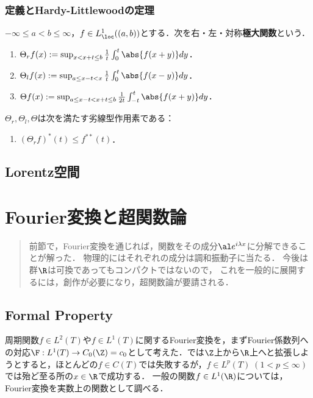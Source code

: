 \documentclass[uplatex,dvipdfmx]{jsreport}
\begin{document}
\subsection{定義とHardy-Littlewoodの定理}

\begin{definition}
    $-\infty\le a<b\le\infty$，$f\in L^1_\loc((a,b))$とする．次を右・左・対称\textbf{極大関数}という．
    \begin{enumerate}
        \item $\Theta_rf(x):=\sup_{x<x+t\le b}\frac{1}{t}\int^t_0\abs{f(x+y)}dy$．
        \item $\Theta_lf(x):=\sup_{a\le x-t<x}\frac{1}{t}\int^t_0\abs{f(x-y)}dy$．
        \item $\Theta f(x):=\sup_{a\le x-t<x+t\le b}\frac{1}{2t}\int^t_{-t}\abs{f(x+y)}dy$．
    \end{enumerate}
\end{definition}

\begin{theorem}
    $\Theta_r,\Theta_l,\Theta$は次を満たす劣線型作用素である：
    \begin{enumerate}
        \item $(\Theta_rf)^*(t)\le f^{**}(t)$．
    \end{enumerate}
\end{theorem}

\section{Lorentz空間}

\chapter{Fourier変換と超関数論}

\begin{quotation}
    前節で，Fourier変換を通じれば，関数をその成分$\al e^{i\lambda x}$に分解できることが解った．
    物理的にはそれぞれの成分は調和振動子に当たる．
    今後は群$\R$は可換であってもコンパクトではないので，
    これを一般的に展開するには，創作が必要になり，超関数論が要請される．
\end{quotation}

\section{Formal Property}

\begin{tcolorbox}[colframe=ForestGreen, colback=ForestGreen!10!white,breakable,colbacktitle=ForestGreen!40!white,coltitle=black,fonttitle=\bfseries\sffamily,
title=]
    周期関数$f\in L^2(T)$や$f\in L^1(T)$に関するFourier変換を，まずFourier係数列への対応$\F:L^1(T)\to C_0(\Z)=c_0$として考えた．では$\Z$上から$\R$上へと拡張しようとすると，ほとんどの$f\in C(T)$では失敗するが，$f\in L^p(T)\;(1<p\le\infty)$では殆ど至る所の$x\in\R$で成功する．
    一般の関数$f\in L^1(\R)$については，Fourier変換を実数上の関数として調べる．
\end{tcolorbox}
\end{document}
